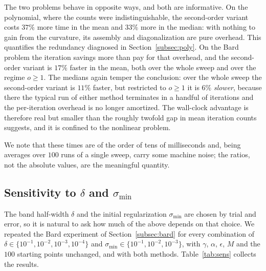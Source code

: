 \documentclass[11pt]{article}
\begin{document}
The two problems behave in opposite ways, and both are informative. On the
polynomial, where the counts were indistinguishable, the second-order variant
costs $37\%$ more time in the mean and $33\%$ more in the median: with nothing
to gain from the curvature, its assembly and diagonalization are pure overhead.
This quantifies the redundancy diagnosed in Section~\ref{subsec:poly}. On the
Bard problem the iteration savings more than pay for that overhead, and the
second-order variant is $17\%$ faster in the mean, both over the whole sweep and
over the regime $o \ge 1$. The medians again temper the conclusion: over the
whole sweep the second-order variant is $11\%$ faster, but restricted to
$o \ge 1$ it is $6\%$ \emph{slower}, because there the typical run of either
method terminates in a handful of iterations and the per-iteration overhead is
no longer amortized. The wall-clock advantage is therefore real but smaller than
the roughly twofold gap in mean iteration counts suggests, and it is confined to
the nonlinear problem.

We note that these times are of the order of tens of milliseconds and, being
averages over $100$ runs of a single sweep, carry some machine noise; the
ratios, not the absolute values, are the meaningful quantity.

\subsection{Sensitivity to $\delta$ and $\sigma_{\min}$} \label{subsec:sens}

The band half-width $\delta$ and the initial regularization $\sigma_{\min}$ are
chosen by trial and error, so it is natural to ask how much of the above depends
on that choice. We repeated the Bard experiment of Section~\ref{subsec:bard} for
every combination of $\delta \in \{10^{-1},10^{-2},10^{-3},10^{-4}\}$ and
$\sigma_{\min} \in \{10^{-1},10^{-2},10^{-3}\}$, with $\gamma$, $\alpha$,
$\epsilon$, $M$ and the $100$ starting points unchanged, and with both methods.
Table~\ref{tab:sens} collects the results.
\end{document}
